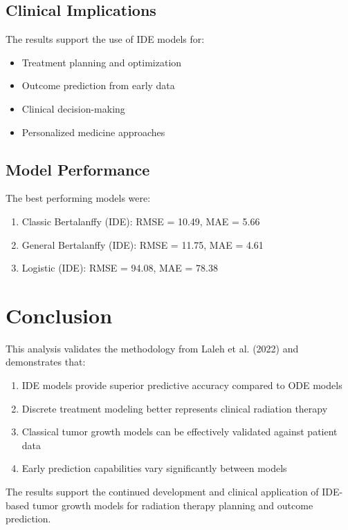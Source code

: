 \documentclass[11pt]{article}
\begin{document}
\subsection{Clinical Implications}

The results support the use of IDE models for:
\begin{itemize}
    \item Treatment planning and optimization
    \item Outcome prediction from early data
    \item Clinical decision-making
    \item Personalized medicine approaches
\end{itemize}

\subsection{Model Performance}

The best performing models were:
\begin{enumerate}
    \item Classic Bertalanffy (IDE): RMSE = 10.49, MAE = 5.66
    \item General Bertalanffy (IDE): RMSE = 11.75, MAE = 4.61
    \item Logistic (IDE): RMSE = 94.08, MAE = 78.38
\end{enumerate}

\section{Conclusion}

This analysis validates the methodology from Laleh et al. (2022) and demonstrates that:

\begin{enumerate}
    \item IDE models provide superior predictive accuracy compared to ODE models
    \item Discrete treatment modeling better represents clinical radiation therapy
    \item Classical tumor growth models can be effectively validated against patient data
    \item Early prediction capabilities vary significantly between models
\end{enumerate}

The results support the continued development and clinical application of IDE-based tumor growth models for radiation therapy planning and outcome prediction.
\end{document}
